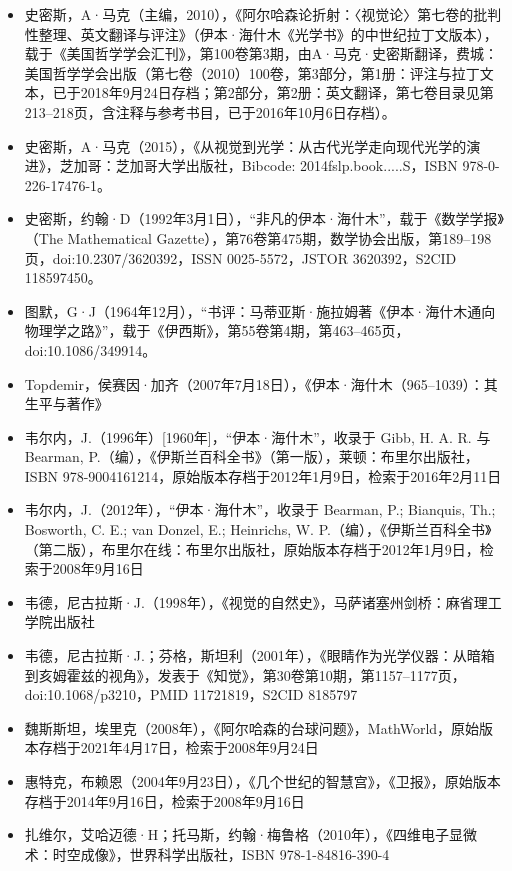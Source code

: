 \begin{itemize}
\item 史密斯，A·马克（主编，2010），《阿尔哈森论折射：〈视觉论〉第七卷的批判性整理、英文翻译与评注》（伊本·海什木《光学书》的中世纪拉丁文版本），载于《美国哲学学会汇刊》，第100卷第3期，由A·马克·史密斯翻译，费城：美国哲学学会出版（第七卷（2010）100卷，第3部分，第1册：评注与拉丁文本，已于2018年9月24日存档；第2部分，第2册：英文翻译，第七卷目录见第213–218页，含注释与参考书目，已于2016年10月6日存档）。
\item 史密斯，A·马克（2015），《从视觉到光学：从古代光学走向现代光学的演进》，芝加哥：芝加哥大学出版社，Bibcode: 2014fslp.book.....S，ISBN 978-0-226-17476-1。
\item 史密斯，约翰·D（1992年3月1日），“非凡的伊本·海什木”，载于《数学学报》（The Mathematical Gazette），第76卷第475期，数学协会出版，第189–198页，doi:10.2307/3620392，ISSN 0025-5572，JSTOR 3620392，S2CID 118597450。
\item 图默，G·J（1964年12月），“书评：马蒂亚斯·施拉姆著《伊本·海什木通向物理学之路》”，载于《伊西斯》，第55卷第4期，第463–465页，doi:10.1086/349914。
\item Topdemir，侯赛因·加齐（2007年7月18日），《伊本·海什木（965–1039）：其生平与著作》
\item 韦尔内，J.（1996年）[1960年]，“伊本·海什木”，收录于 Gibb, H. A. R. 与 Bearman, P.（编），《伊斯兰百科全书》（第一版），莱顿：布里尔出版社，ISBN 978-9004161214，原始版本存档于2012年1月9日，检索于2016年2月11日
\item 韦尔内，J.（2012年），“伊本·海什木”，收录于 Bearman, P.; Bianquis, Th.; Bosworth, C. E.; van Donzel, E.; Heinrichs, W. P.（编），《伊斯兰百科全书》（第二版），布里尔在线：布里尔出版社，原始版本存档于2012年1月9日，检索于2008年9月16日
\item 韦德，尼古拉斯·J.（1998年），《视觉的自然史》，马萨诸塞州剑桥：麻省理工学院出版社
\item 韦德，尼古拉斯·J.；芬格，斯坦利（2001年），《眼睛作为光学仪器：从暗箱到亥姆霍兹的视角》，发表于《知觉》，第30卷第10期，第1157–1177页，doi:10.1068/p3210，PMID 11721819，S2CID 8185797
\item 魏斯斯坦，埃里克（2008年），《阿尔哈森的台球问题》，MathWorld，原始版本存档于2021年4月17日，检索于2008年9月24日
\item 惠特克，布赖恩（2004年9月23日），《几个世纪的智慧宫》，《卫报》，原始版本存档于2014年9月16日，检索于2008年9月16日
\item 扎维尔，艾哈迈德·H；托马斯，约翰·梅鲁格（2010年），《四维电子显微术：时空成像》，世界科学出版社，ISBN 978-1-84816-390-4
\end{itemize}

